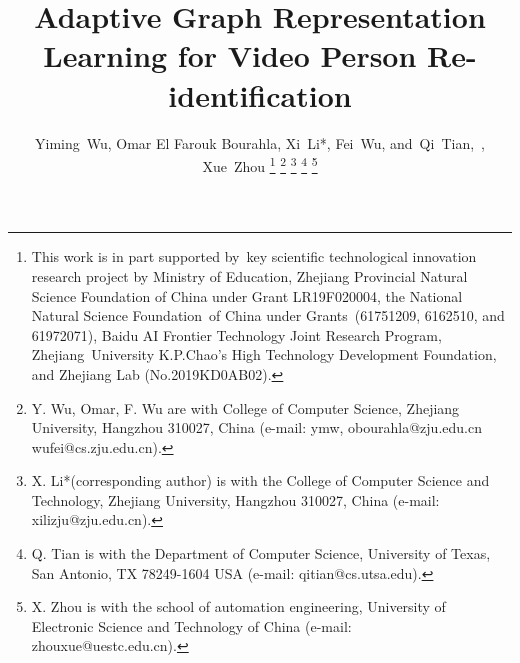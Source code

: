 \documentclass[journal]{IEEEtran}
\begin{document}
\title{Adaptive Graph Representation Learning for Video Person Re-identification}


\author{Yiming~Wu,
        Omar El Farouk Bourahla,
        Xi~Li*,
        Fei~Wu,
        and~Qi~Tian,~,
        Xue~Zhou \thanks{This work is in part supported by key scientific technological innovation research project by Ministry of Education, Zhejiang Provincial Natural Science Foundation of China under Grant LR19F020004, the National Natural Science Foundation of China under Grants (61751209, 6162510, and 61972071), Baidu AI Frontier Technology Joint Research Program, Zhejiang University K.P.Chao's High Technology Development Foundation, and Zhejiang Lab (No.2019KD0AB02).}
\thanks{Y. Wu, Omar, F. Wu are with College of Computer Science, Zhejiang University, Hangzhou 310027, China (e-mail: ymw, obourahla@zju.edu.cn wufei@cs.zju.edu.cn).}
\thanks{X. Li*(corresponding author) is with the College of Computer Science and Technology, Zhejiang University, Hangzhou 310027, China (e-mail: xilizju@zju.edu.cn).}
\thanks{Q. Tian is with the Department of Computer Science, University of Texas, San Antonio, TX 78249-1604 USA (e-mail: qitian@cs.utsa.edu).}
\thanks{X. Zhou is with the school of automation engineering, University of Electronic Science and Technology of China (e-mail: zhouxue@uestc.edu.cn).}
}



\maketitle
\end{document}
